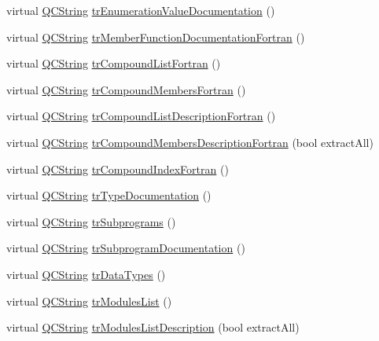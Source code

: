 \begin{DoxyCompactItemize}
\item 
virtual \hyperlink{class_q_c_string}{Q\-C\-String} \hyperlink{class_translator_greek_a4039294191fddf0e9530b920719998fd}{tr\-Enumeration\-Value\-Documentation} ()
\item 
virtual \hyperlink{class_q_c_string}{Q\-C\-String} \hyperlink{class_translator_greek_a006270b30df57f83fe40ad0ed617652e}{tr\-Member\-Function\-Documentation\-Fortran} ()
\item 
virtual \hyperlink{class_q_c_string}{Q\-C\-String} \hyperlink{class_translator_greek_a17985bd956c4940e53e169cadb659c2b}{tr\-Compound\-List\-Fortran} ()
\item 
virtual \hyperlink{class_q_c_string}{Q\-C\-String} \hyperlink{class_translator_greek_add44aa8baf655554ec74dbfac0d43f71}{tr\-Compound\-Members\-Fortran} ()
\item 
virtual \hyperlink{class_q_c_string}{Q\-C\-String} \hyperlink{class_translator_greek_a10aa72b35051f95ba30f2b0312ce705c}{tr\-Compound\-List\-Description\-Fortran} ()
\item 
virtual \hyperlink{class_q_c_string}{Q\-C\-String} \hyperlink{class_translator_greek_a0c98da65b5772e9c2876855a42d44127}{tr\-Compound\-Members\-Description\-Fortran} (bool extract\-All)
\item 
virtual \hyperlink{class_q_c_string}{Q\-C\-String} \hyperlink{class_translator_greek_a933624b6cffb8fdc03e9fc4110640fc9}{tr\-Compound\-Index\-Fortran} ()
\item 
virtual \hyperlink{class_q_c_string}{Q\-C\-String} \hyperlink{class_translator_greek_ae031421205271f1a32fa3838a79b8902}{tr\-Type\-Documentation} ()
\item 
virtual \hyperlink{class_q_c_string}{Q\-C\-String} \hyperlink{class_translator_greek_a8d4e1de8fb5c2af1fd073c682556f999}{tr\-Subprograms} ()
\item 
virtual \hyperlink{class_q_c_string}{Q\-C\-String} \hyperlink{class_translator_greek_add6df0842eb6016d108814567d677055}{tr\-Subprogram\-Documentation} ()
\item 
virtual \hyperlink{class_q_c_string}{Q\-C\-String} \hyperlink{class_translator_greek_a77941890cf3f7cd1b67bec4cea91439b}{tr\-Data\-Types} ()
\item 
virtual \hyperlink{class_q_c_string}{Q\-C\-String} \hyperlink{class_translator_greek_a411e2c242c2707aed706b2b0572292db}{tr\-Modules\-List} ()
\item 
virtual \hyperlink{class_q_c_string}{Q\-C\-String} \hyperlink{class_translator_greek_a4f1ad06ac7478b9058d7f388a2b67566}{tr\-Modules\-List\-Description} (bool extract\-All)

\end{DoxyCompactItemize}
